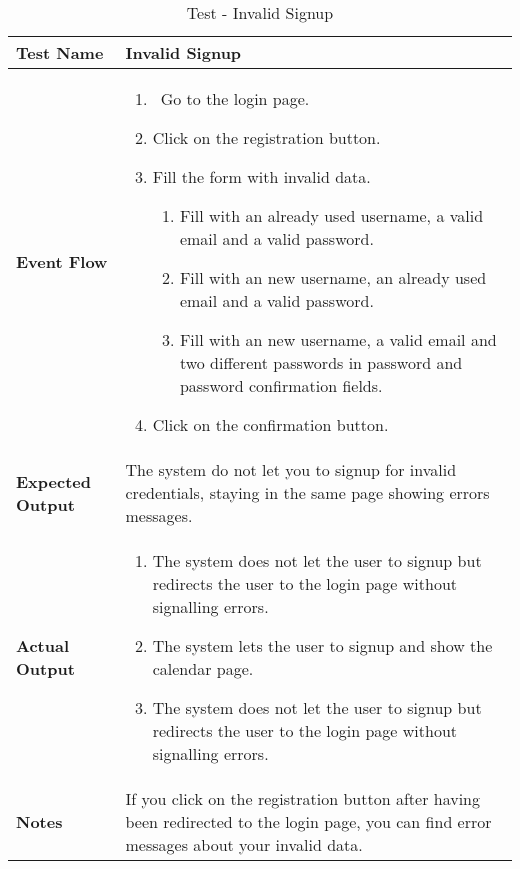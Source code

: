 \begin{table}[h]	
	\centering
	\def\arraystretch{1.5}
	\begin{tabular}{|m{7cm}|m{7cm}|}
		\hline
		\textbf{Test Name}            &  Invalid Signup  \\ \hline
		\textbf{Event Flow}             &  
		\begin{enumerate}
			\item~Go to the login page.
			\item Click on the registration button.
			\item Fill the form with invalid data.
			\begin{enumerate}[label*=\arabic*.]			
				\item Fill with an already used username, a valid email and a valid password.
				\item Fill with an new username, an already used email and a valid password.
				\item Fill with an new username, a valid email and two different passwords in password and password confirmation fields.
			\end{enumerate}
		\item Click on the confirmation button.
		\end{enumerate} \\ \hline
		\textbf{Expected Output}  &  The system do not let you to signup for invalid credentials, staying in the same page showing errors messages.   \\ \hline
		\textbf{Actual Output}       & 
		\begin{enumerate}
			\item The system does not let the user to signup but redirects the user to the login page without signalling errors.
			\item The system lets the user to signup and show the calendar page.
			\item The system does not let the user to signup but redirects the user to the login page without signalling errors.
		\end{enumerate}    \\ \hline
		\textbf{Notes} &  If you click on the registration button after having been redirected to the login page, you can find error messages about your invalid data. \\ \hline
	\end{tabular}
	\caption{Test - Invalid Signup}
\end{table}


